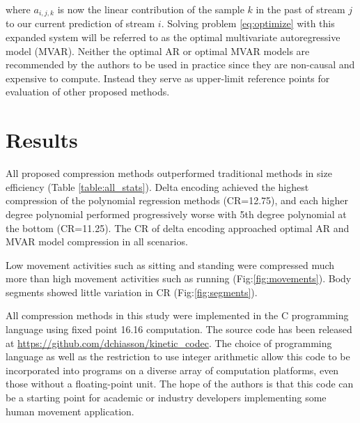 \documentclass[journal]{IEEEtran}
\begin{document}
where $a_{i,j,k}$ is now the linear contribution of the sample $k$ in the past of stream $j$ to our current prediction of stream $i$. Solving problem \eqref{eq:optimize} with this expanded system will be referred to as the optimal multivariate autoregressive model (MVAR). Neither the optimal AR or optimal MVAR models are recommended by the authors to be used in practice since they are non-causal and expensive to compute. Instead they serve as upper-limit reference points for evaluation of other proposed methods.

\section{Results}

All proposed compression methods outperformed traditional methods in size efficiency (Table \ref{table:all_stats}). Delta encoding achieved the highest compression of the polynomial regression methods (CR=12.75), and each higher degree polynomial performed progressively worse with 5th degree polynomial at the bottom (CR=11.25). The CR of delta encoding approached optimal AR and MVAR model compression in all scenarios.

Low movement activities such as sitting and standing were compressed much more than high movement activities such as running (Fig:\ref{fig:movements}). Body segments showed little variation in CR (Fig:\ref{fig:segments}).

All compression methods in this study were implemented in the C programming language using fixed point 16.16 computation. The source code has been released at \url{https://github.com/dchiasson/kinetic_codec}. The choice of programming language as well as the restriction to use integer arithmetic allow this code to be incorporated into programs on a diverse array of computation platforms, even those without a floating-point unit. The hope of the authors is that this code can be a starting point for academic or industry developers implementing some human movement application.
\end{document}
